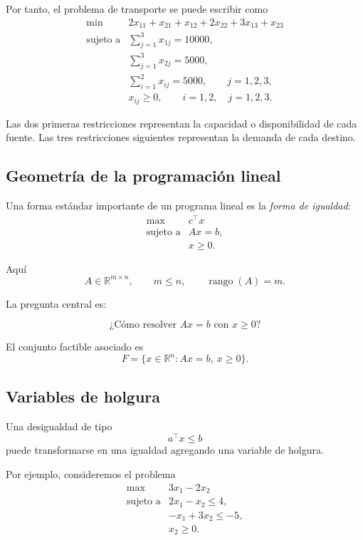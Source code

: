 Por tanto, el problema de transporte se puede escribir como
\[
    \begin{array}{ll}
        \min
        &
        2x_{11}+x_{21}
        +
        x_{12}+2x_{22}
        +
        3x_{13}+x_{23}
        \\[2mm]
        \text{sujeto a}
        &
        \displaystyle
        \sum_{j=1}^{3}x_{1j}=10000,
        \\[3mm]
        &
        \displaystyle
        \sum_{j=1}^{3}x_{2j}=5000,
        \\[3mm]
        &
        \displaystyle
        \sum_{i=1}^{2}x_{ij}=5000,
        \qquad j=1,2,3,
        \\[3mm]
        &
        x_{ij}\geq 0,
        \qquad i=1,2,\quad j=1,2,3.
    \end{array}
\]

Las dos primeras restricciones representan la capacidad o disponibilidad de cada fuente. Las tres restricciones siguientes representan la demanda de cada destino.

\subsection{Geometría de la programación lineal}

Una forma estándar importante de un programa lineal es la \emph{forma de igualdad}:
\[
    \begin{array}{ll}
        \max & c^\top x\\[1mm]
        \text{sujeto a} & Ax=b,\\
        & x\geq 0.
    \end{array}
\]

Aquí
\[
    A\in\mathbb{R}^{m\times n},
    \qquad
    m\leq n,
    \qquad
    \operatorname{rango}(A)=m.
\]

La pregunta central es:

\[
    \text{¿Cómo resolver } Ax=b \text{ con } x\geq 0?
\]

El conjunto factible asociado es
\[
    F
    =
    \{x\in\mathbb{R}^n:Ax=b,\ x\geq 0\}.
\]

\subsection{Variables de holgura}

Una desigualdad de tipo
\[
    a^\top x\leq b
\]
puede transformarse en una igualdad agregando una variable de holgura.

Por ejemplo, consideremos el problema
\[
    \begin{array}{ll}
        \max & 3x_1-2x_2\\[1mm]
        \text{sujeto a}
        &
        2x_1-x_2\leq 4,\\
        &
        -x_1+3x_2\leq -5,\\
        &
        x_2\geq 0.
    \end{array}
\]

